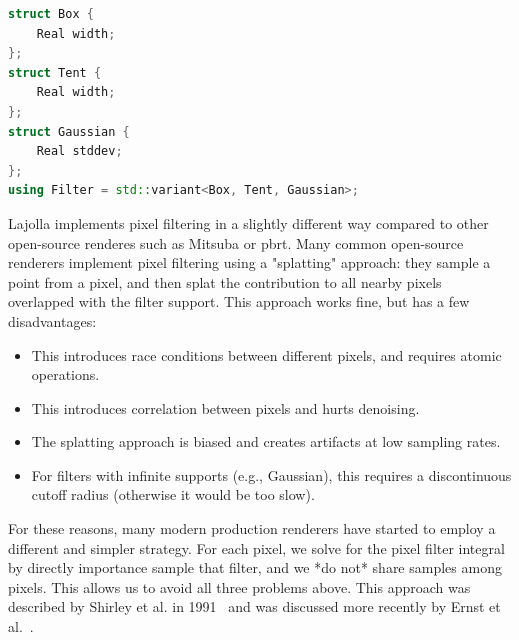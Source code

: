 \begin{lstlisting}[language=c++]
struct Box {
    Real width;
};
struct Tent {
    Real width;
};
struct Gaussian {
    Real stddev;
};
using Filter = std::variant<Box, Tent, Gaussian>;
\end{lstlisting}

Lajolla implements pixel filtering in a slightly different way compared to other open-source renderes such as Mitsuba or pbrt. Many common open-source renderers implement pixel filtering using a "splatting" approach: they sample a point from a pixel, and then splat the contribution to all nearby pixels overlapped with the filter support. This approach works fine, but has a few disadvantages:
\begin{itemize}
    \item This introduces race conditions between different pixels, and requires atomic operations.
    \item This introduces correlation between pixels and hurts denoising.
    \item The splatting approach is biased and creates artifacts at low sampling rates.
    \item For filters with infinite supports (e.g., Gaussian), this requires a discontinuous cutoff radius (otherwise it would be too slow).
\end{itemize}
For these reasons, many modern production renderers have started to employ a different and simpler strategy. For each pixel, we solve for the pixel filter integral by directly importance sample that filter, and we *do not* share samples among pixels. This allows us to avoid all three problems above. This approach was described by Shirley et al. in 1991~\cite{Shirley:1991:RTF} and was discussed more recently by Ernst et al.~\cite{Ernst:2006:FIS}.

